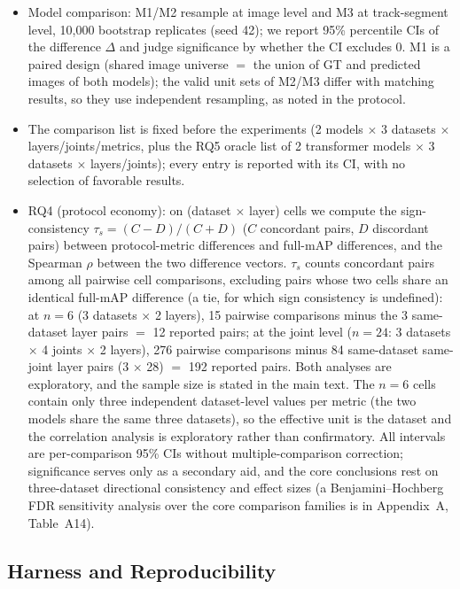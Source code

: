 \documentclass[10pt,conference]{IEEEtran}
\begin{document}
\begin{itemize}
\item Model comparison: M1/M2 resample at image level and M3 at track-segment level, 10,000 bootstrap replicates (seed 42); we report 95\% percentile CIs of the difference $\Delta$ and judge significance by whether the CI excludes 0. M1 is a paired design (shared image universe $=$ the union of GT and predicted images of both models); the valid unit sets of M2/M3 differ with matching results, so they use independent resampling, as noted in the protocol.
\item The comparison list is fixed before the experiments (2 models $\times$ 3 datasets $\times$ layers/joints/metrics, plus the RQ5 oracle list of 2 transformer models $\times$ 3 datasets $\times$ layers/joints); every entry is reported with its CI, with no selection of favorable results.
\item RQ4 (protocol economy): on (dataset $\times$ layer) cells we compute the sign-consistency $\tau_s=(C-D)/(C+D)$ ($C$ concordant pairs, $D$ discordant pairs) between protocol-metric differences and full-mAP differences, and the Spearman $\rho$ between the two difference vectors. $\tau_s$ counts concordant pairs among all pairwise cell comparisons, excluding pairs whose two cells share an identical full-mAP difference (a tie, for which sign consistency is undefined): at $n=6$ (3 datasets $\times$ 2 layers), 15 pairwise comparisons minus the 3 same-dataset layer pairs $=$ 12 reported pairs; at the joint level ($n=24$: 3 datasets $\times$ 4 joints $\times$ 2 layers), 276 pairwise comparisons minus 84 same-dataset same-joint layer pairs (3 $\times$ 28) $=$ 192 reported pairs. Both analyses are exploratory, and the sample size is stated in the main text. The $n=6$ cells contain only three independent dataset-level values per metric (the two models share the same three datasets), so the effective unit is the dataset and the correlation analysis is exploratory rather than confirmatory. All intervals are per-comparison 95\% CIs without multiple-comparison correction; significance serves only as a secondary aid, and the core conclusions rest on three-dataset directional consistency and effect sizes (a Benjamini--Hochberg FDR sensitivity analysis over the core comparison families is in Appendix~A, Table~A14).
\end{itemize}

\subsection{Harness and Reproducibility}
\end{document}
